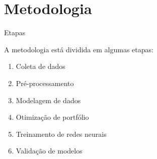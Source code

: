 \section{Metodologia}



    \begin{frame}{Etapas}

        \LARGE

        A metodologia está dividida em algumas etapas:

        \begin{enumerate}
            \item Coleta de dados
            \item Pré-processamento
            \item Modelagem de dados
            \item Otimização de portfólio
            \item Treinamento de redes neurais 
            \item Validação de modelos
        \end{enumerate}

    \end{frame}




